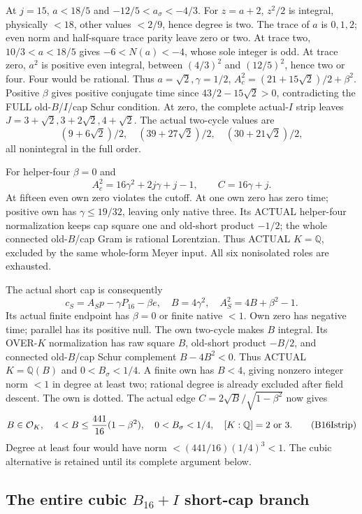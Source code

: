 At \(j=15\), \(a<18/5\) and
\(-12/5<a_\sigma<-4/3\).
For \(z=a+2\), \(z^2/2\) is integral,
physically \(<18\), other values
\(<2/9\), hence degree is two.
The trace of \(a\) is \(0,1,2\);
even norm and half-square trace parity
leave zero or two.
At trace two, \(10/3<a<18/5\)
gives \(-6<N(a)<-4\), whose sole
integer is odd.
At trace zero, \(a^2\) is positive
even integral, between \((4/3)^2\)
and \((12/5)^2\), hence two or four.
Four would be rational.
Thus \(a=\sqrt2,\gamma=1/2\),
\(A_c^2=(21+15\sqrt2)/2+\beta^2\).
Positive \(\beta\) gives positive
conjugate time since
\(43/2-15\sqrt2>0\), contradicting
the FULL old-\(B\)/\(I\)/cap Schur condition.
At zero, the complete actual-\(I\) strip
leaves \(J=3+\sqrt2,3+2\sqrt2,4+\sqrt2\).
The actual two-cycle values are
\[
                  (9+6\sqrt2)/2,\quad(39+27\sqrt2)/2,\quad
                                           (30+21\sqrt2)/2 ,
\]
all nonintegral in the full order.

For helper-four \(\beta=0\) and
\[
                 A_c^2=16\gamma^2+2j\gamma+j-1,\qquad C=16\gamma+j .
\]
At fifteen even own zero violates the
cutoff.
At one own zero has zero time;
positive own has \(\gamma\le19/32\),
leaving only native three.
Its ACTUAL helper-four normalization
keeps cap square one and old-short
product \(-1/2\); the whole connected
old-\(B\)/cap Gram is rational Lorentzian.
Thus ACTUAL \(K=\mathbb Q\), excluded
by the same whole-form Meyer input.
All six nonisolated roles are exhausted.

The actual short cap is consequently
\[
 c_S=A_Sp-\gamma P_{16}-\beta e,\quad
 B=4\gamma^2,\quad A_S^2=4B+\beta^2-1 .
\]
Its actual finite endpoint has
\(\beta=0\) or finite native \(<1\).
Own zero has negative time; parallel
has its positive null.
The own two-cycle makes \(B\) integral.
Its OVER-\(K\) normalization has raw
square \(B\), old-short product \(-B/2\),
and connected old-\(B\)/cap Schur
complement \(B-4B^2<0\).
Thus ACTUAL \(K=\mathbb Q(B)\) and
\(0<B_\sigma<1/4\).
A finite own has \(B<4\), giving
nonzero integer norm \(<1\) in degree
at least two; rational degree is already
excluded after field descent.
The own is dotted.
The actual edge
\(C=2\sqrt B/\sqrt{1-\beta^2}\) now gives
\[
 B\in\mathcal O_K,\quad4<B\le{441\over16}(1-\beta^2),\quad
 0<B_\sigma<1/4,\quad [K:\mathbb Q]=2\ \hbox{or }3 .
\tag{B16Istrip}\label{eq:arithB16Iisolatedstrip}
\]
Degree at least four would have norm
\(<(441/16)(1/4)^3<1\).
The cubic alternative is retained until
its complete argument below.

\subsection{The entire cubic \(B_{16}+I\) short-cap branch}
\label{app:arithB16Icubic}

